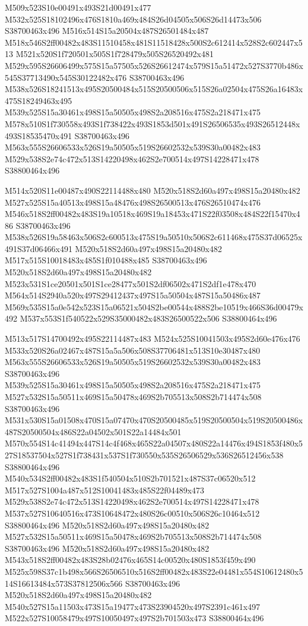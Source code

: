 \documentclass{article}
\begin{document}
\begin{multicols}{2}
M509x523S10e00491x493S21d00491x477 M532x525S18102496x476S1810a469x484S26d04505x506S26d14473x506 S38700463x496 M516x514S15a20504x487S26501484x487 M518x546S2ff00482x483S11510458x481S11518428x500S2c612414x528S2c602447x513 M521x520S1f720501x505S1f728479x505S26520492x481 M529x595S26606499x575S15a57505x526S26612474x579S15a51472x527S3770b486x545S37713490x545S30122482x476 S38700463x496 M538x526S18241513x495S20500484x515S20500506x515S26a02504x475S26a16483x475S18249463x495 M539x525S15a30461x498S15a50505x498S2a208516x475S2a218471x475 M578x510S1f730558x493S1f738422x493S1853d501x491S26506535x493S26512448x493S18535470x491 S38700463x496 M563x555S26606533x526S19a50505x519S26602532x539S30a00482x483 M529x538S2e74c472x513S14220498x462S2e700514x497S14228471x478 S38800464x496

M514x520S11e00487x490S22114488x480 M520x518S2d60a497x498S15a20480x482 M527x525S15a40513x498S15a48476x498S26500513x476S26510474x476 M546x518S2ff00482x483S19a10518x469S19a18453x471S22f03508x484S22f15470x486 S38700463x496 M538x526S19a58463x506S2c600513x475S19a50510x506S2c611468x475S37d06525x491S37d06466x491 M520x518S2d60a497x498S15a20480x482 M517x515S10018483x485S1f010488x485 S38700463x496 M520x518S2d60a497x498S15a20480x482 M523x531S1ce20501x501S1ce28477x501S2df06502x471S2df1e478x470 M564x514S2940a520x497S29412437x497S15a50504x487S15a50486x487 M569x535S15a0e542x523S15a06521x504S2be00544x488S2be10519x466S36d00479x492 M537x553S1f540522x529S35000482x483S26500522x506 S38800464x496

M513x517S14700492x495S22114487x483 M524x525S10041503x495S2d60e476x476 M533x520S26a02467x487S15a5a506x508S37706481x513S10e30487x480 M563x555S26606533x526S19a50505x519S26602532x539S30a00482x483 S38700463x496 M539x525S15a30461x498S15a50505x498S2a208516x475S2a218471x475 M527x532S15a50511x469S15a50478x469S2b705513x508S2b714474x508 S38700463x496 M531x530S15a01508x470S15a07470x470S20500485x519S20500504x519S20500486x487S20500504x486S22a04502x501S22a14484x501 M570x554S14c41494x447S14c4f468x465S22a04507x480S22a14476x494S1853f480x527S18537504x527S1f738431x537S1f730550x535S26506529x536S26512456x538 S38800464x496 M540x534S2ff00482x483S1f540504x510S2b701521x487S37c06520x512 M517x527S1004a487x512S10041483x485S22f04489x473 M529x538S2e74c472x513S14220498x462S2e700514x497S14228471x478 M537x527S10640516x473S10648472x480S26c00510x506S26c10464x512 S38800464x496 M520x518S2d60a497x498S15a20480x482 M527x532S15a50511x469S15a50478x469S2b705513x508S2b714474x508 S38700463x496 M520x518S2d60a497x498S15a20480x482 M543x518S2ff00482x483S28b02476x465S14c00520x480S1853f459x490 M525x598S37c1b498x566S26506510x516S2ff00482x483S22e04481x554S10612480x514S16613484x573S37812506x566 S38700463x496 M520x518S2d60a497x498S15a20480x482 M540x527S15a11503x473S15a19477x473S23904520x497S2391c461x497 M522x527S10058479x497S10050497x497S2b701503x473 S38800464x496


\end{multicols}
\end{document}
